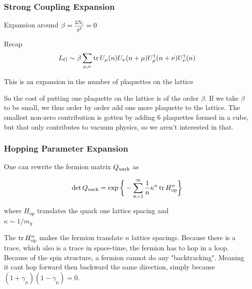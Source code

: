 \documentclass[12pt,a4paper,dvipsnames,usenames]{beamer}
\begin{document}
\begin{frame}
  \frametitle{Strong Coupling Expansion}

  Expansion around $\beta = \scalebox{0.75}{$\displaystyle\frac{2 N_c}{g^2}$} = 0$

  \vspace{2em}

  \begin{block}{Recap}
    \[ L_G \sim \beta\sum_{\mu,\nu} \operatorname{tr} U_{\mu}(n) U_{\nu}(n+\mu) U^{\dagger}_{\mu}(n+\nu) U^{\dagger}_{\nu}(n) \]
  \end{block}

  \vspace{1em}

  This is an expansion in the number of plaquettes on the lattice

  \note
  {
    So the cost of putting one plaquette on the lattice is of the order $\beta$. If we take $\beta$ to be small, we thus order by
    order add one more plaquette to the lattice. The smallest non-zero contribution is gotten by adding 6 plaquettes formed in a
    cube, but that only contributes to vacuum physics, so we aren't interested in that.
  }

\end{frame}

\begin{frame}
  \frametitle{Hopping Parameter Expansion}

  One can rewrite the fermion matrix $Q_{\mathrm{uark}}$ as
  
  \vspace{2em}

  \begin{block}{}
    \[
      \det Q_{\mathrm{uark}} = \exp \bigg\{ - \sum_{n=1}^{\infty} \frac{1}{n} \kappa^n \operatorname{tr} H_{\mathrm{op}}^n \bigg\}
    \]
  \end{block}

  \vspace{1em}

  where $H_{\mathrm{op}}$ translates the quark one lattice spacing and \\ $\kappa \sim 1/m_q$

  \note
  {
    The $\operatorname{tr} H_{\mathrm{op}}^n$ makes the fermion translate $n$ lattice spacings. Because there is a trace, which also is a trace
    in space-time, the fermion has to hop in a loop. Because of the spin structure, a fermion cannot do any "backtracking".
    Meaning it cant hop forward then backward the same direction, simply because $(1 + \gamma_{\mu})(1 - \gamma_{\mu}) = 0$.
  }

\end{frame}
\end{document}
